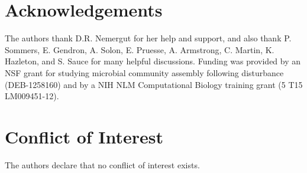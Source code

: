 \documentclass{article}
\begin{document}
\section{Acknowledgements}
The authors thank D.R. Nemergut for her help and support, and also thank P. Sommers, E. Gendron, A. Solon, E. Pruesse, A. Armstrong, C. Martin, K. Hazleton, and S. Sauce for many helpful discussions. Funding was provided by an NSF grant for studying microbial community assembly following disturbance (DEB-1258160) and by a NIH NLM Computational Biology training grant (5 T15 LM009451-12).

\section{Conflict of Interest}
The authors declare that no conflict of interest exists.



\newpage
\end{document}
